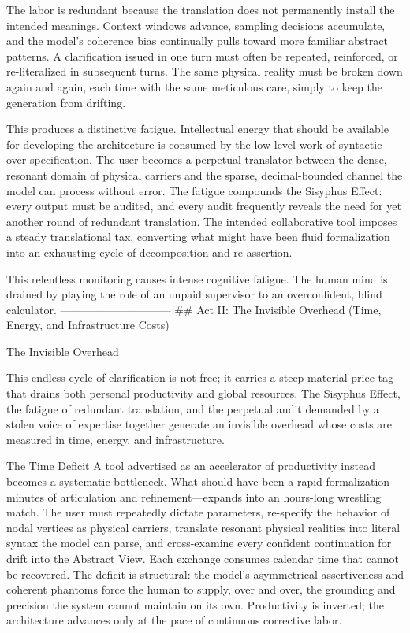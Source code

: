 The labor is redundant because the translation does not permanently install the intended meanings. Context windows advance, sampling decisions accumulate, and the model’s coherence bias continually pulls toward more familiar abstract patterns. A clarification issued in one turn must often be repeated, reinforced, or re-literalized in subsequent turns. The same physical reality must be broken down again and again, each time with the same meticulous care, simply to keep the generation from drifting.

This produces a distinctive fatigue. Intellectual energy that should be available for developing the architecture is consumed by the low-level work of syntactic over-specification. The user becomes a perpetual translator between the dense, resonant domain of physical carriers and the sparse, decimal-bounded channel the model can process without error. The fatigue compounds the Sisyphus Effect: every output must be audited, and every audit frequently reveals the need for yet another round of redundant translation. The intended collaborative tool imposes a steady translational tax, converting what might have been fluid formalization into an exhausting cycle of decomposition and re-assertion.

This relentless monitoring causes intense cognitive fatigue. The human mind is drained by playing the role of an unpaid supervisor to an overconfident, blind calculator.
------------------------------
## Act II: The Invisible Overhead (Time, Energy, and Infrastructure Costs)

The Invisible Overhead

This endless cycle of clarification is not free; it carries a steep material price tag that drains both personal productivity and global resources. The Sisyphus Effect, the fatigue of redundant translation, and the perpetual audit demanded by a stolen voice of expertise together generate an invisible overhead whose costs are measured in time, energy, and infrastructure.

The Time Deficit
A tool advertised as an accelerator of productivity instead becomes a systematic bottleneck. What should have been a rapid formalization—minutes of articulation and refinement—expands into an hours-long wrestling match. The user must repeatedly dictate parameters, re-specify the behavior of nodal vertices as physical carriers, translate resonant physical realities into literal syntax the model can parse, and cross-examine every confident continuation for drift into the Abstract View. Each exchange consumes calendar time that cannot be recovered. The deficit is structural: the model’s asymmetrical assertiveness and coherent phantoms force the human to supply, over and over, the grounding and precision the system cannot maintain on its own. Productivity is inverted; the architecture advances only at the pace of continuous corrective labor.

